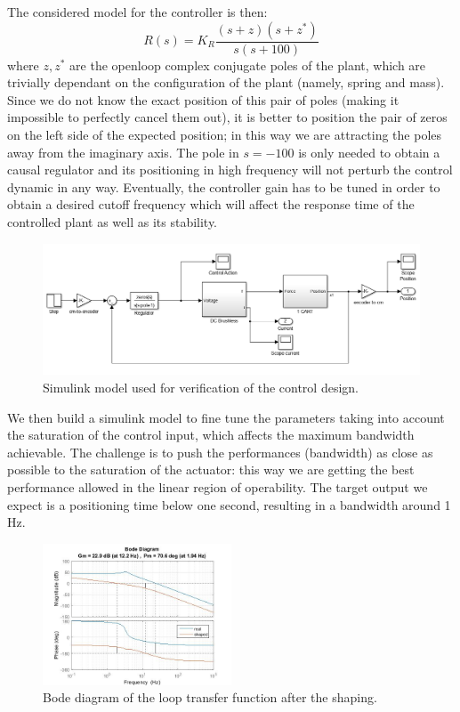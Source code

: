 The considered model for the controller is then:
\begin{equation}
R(s) = K_R\frac{(s+z)(s+z^*)}{s(s+100)}
\end{equation}
where $z,z^*$ are the openloop complex conjugate poles of the plant, which are trivially dependant on the configuration of the plant (namely, spring and mass). Since we do not know the exact position of this pair of poles (making it impossible to perfectly cancel them out), it is better to position the pair of zeros on the left side of the expected position; in this way we are attracting the poles away from the imaginary axis. The pole in $s=-100$ is only needed to obtain a causal regulator and its positioning in high frequency will not perturb the control dynamic in any way. Eventually, the controller gain has to be tuned in order to obtain a desired cutoff frequency which will affect the response time of the controlled plant as well as its stability. \\

\begin{figure}
\includegraphics[width=\textwidth]{img/ls_simulink.png}
\caption{Simulink model used for verification of the control design.}
\end{figure}

We then build a simulink model to fine tune the parameters taking into account the saturation of the control input, which affects the maximum bandwidth achievable. The challenge is to push the performances (bandwidth) as close as possible to the saturation of the actuator: this way we are getting the best performance allowed in the linear region of operability. The target output we expect is a positioning time below one second, resulting in a bandwidth around 1 Hz.\\

\begin{figure}[H]
\includegraphics[width=0.5\textwidth]{img/ls_bode_shaping.jpg}
\caption{Bode diagram of the loop transfer function after the shaping.}
\end{figure}

